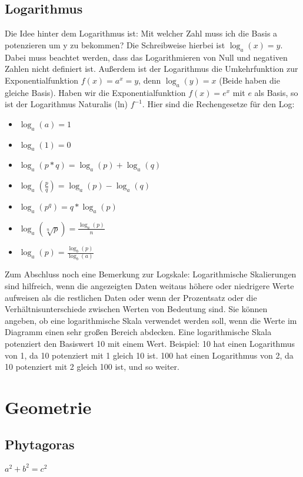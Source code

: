 \documentclass[letterpaper, titlepage]{article}
\begin{document}
\subsection{Logarithmus}\label{Logarithmus}
Die Idee hinter dem Logarithmus ist: Mit welcher Zahl muss ich die Basis a potenzieren um y zu bekommen? Die Schreibweise hierbei ist $\log_a(x)=y$. Dabei muss beachtet werden, dass das Logarithmieren von Null und negativen Zahlen nicht definiert ist. Außerdem ist der Logarithmus die Umkehrfunktion zur Exponentialfunktion $f(x)=a^x=y$, denn $\log_a(y)=x$ (Beide haben die gleiche Basis). Haben wir die Exponentialfunktion $f(x)=e^x$ mit $e$ als Basis, so ist der Logarithmus Naturalis (ln) $f^{-1}$. Hier sind die Rechengesetze für den Log:\\
\begin{itemize}
    \item $\log_a(a)=1$
    \item $\log_a(1)=0$
    \item $\log_a(p*q)=\log_a(p)+\log_a(q)$
    \item $\log_a(\frac{p}{q})=\log_a(p)-\log_a(q)$
    \item $\log_a(p^q)=q*\log_a(p)$
    \item $\log_a(\sqrt[n]{p})=\frac{\log_a(p)}{n}$
    \item $\log_a(p)=\frac{\log_b(p)}{\log_b(a)}$
\end{itemize}
\vspace{0.6cm}
Zum Abschluss noch eine Bemerkung zur Logskale: Logarithmische Skalierungen sind hilfreich, wenn die angezeigten Daten weitaus höhere oder niedrigere Werte aufweisen als die restlichen Daten oder wenn der Prozentsatz oder die Verhältnisunterschiede zwischen Werten von Bedeutung sind. Sie können angeben, ob eine logarithmische Skala verwendet werden soll, wenn die Werte im Diagramm einen sehr großen Bereich abdecken. Eine logarithmische Skala potenziert den Basiswert 10 mit einem Wert. Beispiel: 10 hat einen Logarithmus von 1, da 10 potenziert mit 1 gleich 10 ist. 100 hat einen Logarithmus von 2, da 10 potenziert mit 2 gleich 100 ist, und so weiter.%


\section{Geometrie}\label{Gemoetrie}


\subsection{Phytagoras}\label{Phytagoras}
$a^2+b^2=c^2$
\end{document}
